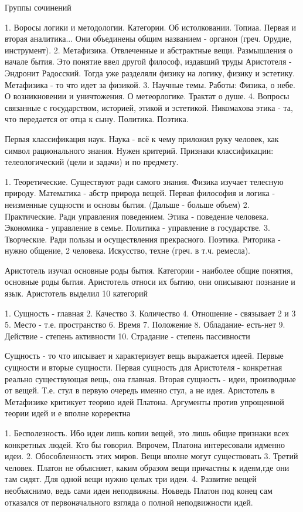 
Группы сочинений

	1. Воросы логики и методологии. Категории. Об истолковании. Топиаа. Первая и вторая аналитика... Они объединены общим названием - органон (греч. Орудие, инструмент).
	2. Метафизика. Отвлеченные и абстрактные вещи.  Размышления о начале бытия. Это понятие ввел другой философ, издавший труды Аристотеля - Эндронит Радосский. Тогда уже разделяли физику на логику, физику и эстетику. Метафизика - то что идет за физикой.
	3. Научные темы. Работы: Физика, о небе. О возникновении и уничтожения. О метеорлогике. Трактат о душе.
	4. Вопросы связанные с государством, историей, этикой и эстетикой. Никомахова этика - та, что передается от отца к сыну. Политика. Поэтика.

Первая классификация наук. Наука - всё к чему приложил руку человек, как символ рационального знания. Нужен критерий. Признаки классификации: телеологический (цели и задачи) и по предмету.

	1. Теоретические. Существуют ради самого знания. Физика изучает телесную природу. Математика - абстр природа вещей. Первая философия и логика - неизменные сущности и основы бытия. (Дальше - больше объем)
	2. Практические. Ради управления поведением. Этика - поведение человека. Экономика - управление в семье. Политика - управление в государстве.
	3. Творческие. Ради пользы и осуществления прекрасного. Поэтика. Риторика - нужно общение, 2 человека. Искусство, техне (греч. в т.ч. ремесла).

Аристотель изучал основные роды бытия. Категории - наиболее общие понятия, основные роды бытия. Аристотель относи их бытию, они описывают познание и язык. 
Аристотель выделил 10 категорий

	1. Сущность - главная
	2. Качество
	3. Количество
	4. Отношение - связывает 2 и 3
	5. Место - т.е. пространство
	6. Время
	7. Положение
	8. Обладание- есть-нет
	9. Действие - степень активности
	10. Страдание - степень пассивности

Сущность - то что ипсывает и характеризует вещь выражается идеей. Первые сущности и вторые сущности. Первая сущность для Аристотеля - конкретная реально существующая вещь, она главная. Вторая сущность - идеи, производные от вещей. Т.е. стул в первую очередь именно стул, а не идея. Аристотель в Метафизике критикует теорию идей Платона. Аргументы против упрощенной теории идей и е вполне кореректна

	1. Бесполезность. Ибо идеи лишь копии вещей, это лишь общие признаки всех конкретных людей. Кто бы говорил. Впрочем, Платона интересовали идменно идеи.
	2. Обособленность этих миров. Вещи вполне могут существовать
	3. Третий человек. Платон не объясняет, каким образом вещи причастны к идеям,где они там сидят. Для одной вещи нужно целых три идеи.
	4. Развитие вещей необъяснимо, ведь сами идеи неподвижны. Ноьведь Платон под конец сам отказался от первоначального взгляда о полной неподвижности идей.


